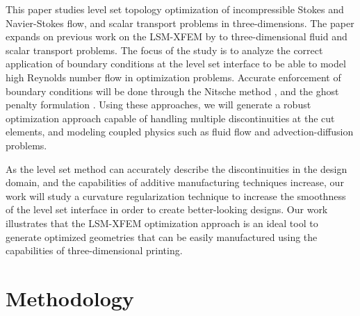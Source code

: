 

This paper studies level set topology optimization of incompressible Stokes and Navier-Stokes flow, and scalar transport problems in three-dimensions. The paper expands on previous work on the LSM-XFEM by \citep{MM:14,VM:14} to three-dimensional fluid and scalar transport problems. The focus of the study is to analyze the correct application of boundary conditions at the level set interface to be able to model high Reynolds number flow in optimization problems. Accurate enforcement of boundary conditions will be done through the Nitsche method \citep{BH:12}, and the ghost penalty formulation \citep{SRG+:14}. Using these approaches, we will generate a robust optimization approach capable of handling multiple discontinuities at the cut elements, and modeling coupled physics such as fluid flow and advection-diffusion problems.

As the level set method can accurately describe the discontinuities in the design domain, and the capabilities of additive manufacturing techniques increase, our work will study a curvature regularization technique to increase the smoothness of the level set interface in order to create better-looking designs.
Our work illustrates that the LSM-XFEM optimization approach is an ideal tool to generate optimized geometries that can be easily manufactured using the capabilities of three-dimensional printing.

% 


\section{Methodology}
\label{sec:fluids_methodology}

